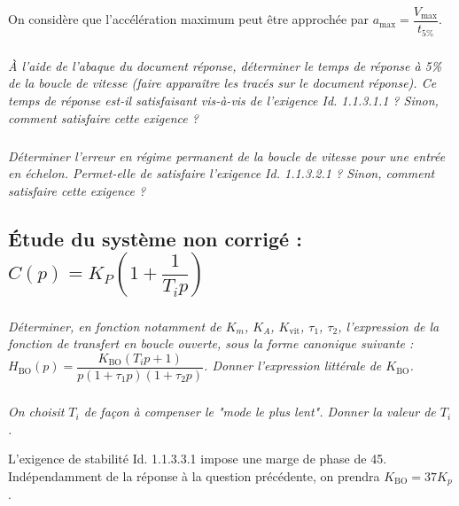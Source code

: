 \begin{multicols}{2}
\begin{multicols}{2}

On considère que l'accélération maximum peut être approchée par $a_{\text{max}}=\dfrac{V_{\text{max}}}{t_{5\%}}$.

\subparagraph{}
\textit{À l’aide de l’abaque du document réponse, déterminer le temps de réponse à 5\% de la
boucle de vitesse (faire apparaître les tracés sur le document réponse). Ce temps de réponse est-il
satisfaisant vis-à-vis de l’exigence Id. 1.1.3.1.1 ? Sinon, comment satisfaire cette exigence ?}
\ifprof
\begin{corrige}
\end{corrige}
\else
\fi

\subparagraph{}
\textit{Déterminer l’erreur en régime permanent de la boucle de vitesse pour une entrée en échelon.
Permet-elle de satisfaire l’exigence Id. 1.1.3.2.1 ? Sinon, comment satisfaire cette exigence ?}
\ifprof
\begin{corrige}
\end{corrige}
\else
\fi

\subsection*{Étude du système non corrigé : $C(p)=K_P\left(1+\dfrac{1}{T_i p}\right)$}

\subparagraph{}
\textit{Déterminer, en fonction notamment de $K_m$, $K_A$, $K_{\text{vit}}$, $\tau_1$, $\tau_2$, l'expression de la fonction de transfert en boucle ouverte, sous la forme canonique suivante : $H_{\text{BO}}(p)=\dfrac{K_{\text{BO}}\left(T_i p +1 \right)}{p\left(1+\tau_1 p \right)\left(1+\tau_2 p \right)}$. Donner l'expression littérale de $K_{\text{BO}}$.}
\ifprof
\begin{corrige}
\end{corrige}
\else
\fi


\subparagraph{}
\textit{On choisit $T_i$ de façon à compenser le "mode le plus lent". Donner la valeur de $T_i$.}
\ifprof
\begin{corrige}
\end{corrige}
\else
\fi

L’exigence de stabilité Id. 1.1.3.3.1 impose une marge de phase de 45\degres. Indépendamment de la réponse à la question précédente, on prendra $K_{\text{BO}} = 37 K_p$.


\end{multicols}
\end{multicols}

